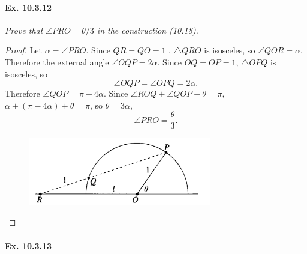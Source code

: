 \documentclass[11pt,a4paper]{article}
\begin{document}
\paragraph{Ex. 10.3.12}

{\it Prove that $\angle PRO = \theta/3$ in the construction (10.18). 
}

\begin{proof} 
 Let $\alpha = \angle PRO$. Since $QR = QO=1$ , $\triangle QRO$ is isosceles, so $\angle QOR = \alpha$. Therefore the external angle $\angle OQP = 2\alpha$. Since $OQ = OP =1$, $\triangle OPQ$ is isosceles, so 
 $$\angle OQP = \angle OPQ = 2\alpha.$$
 Therefore $\angle QOP = \pi - 4\alpha$. Since $\angle ROQ + \angle QOP + \theta = \pi,$ $\alpha + (\pi - 4 \alpha) + \theta = \pi$, so $\theta = 3\alpha$,
 $$\angle PRO = \frac{\theta}{3}.$$
 \begin{figure}[htbp]
\begin{center}
\includegraphics [width=8cm,height=3cm] {Ex.10.3.12.png}
\end{center}
\end{figure}

\end{proof}


\paragraph{Ex. 10.3.13}
\end{document}
